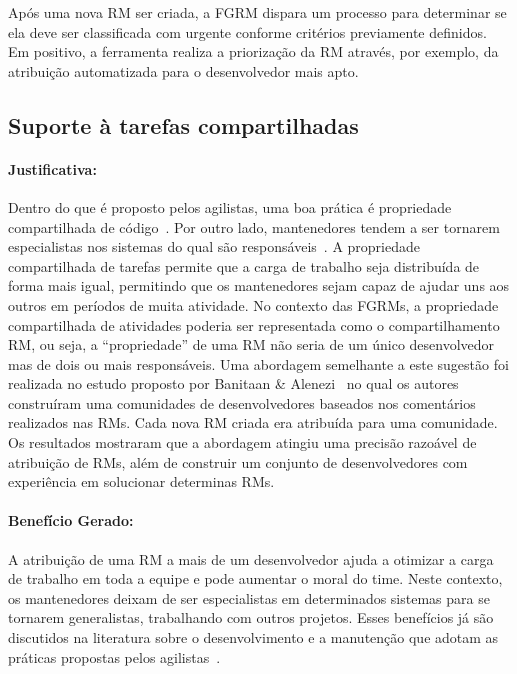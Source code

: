 Após uma nova RM ser criada, a FGRM dispara um processo para determinar se ela
deve ser classificada com urgente conforme critérios previamente definidos. Em
positivo, a ferramenta realiza a priorização da RM através, por exemplo, da
atribuição automatizada para o desenvolvedor mais apto.

\subsection{Suporte à tarefas compartilhadas}
\label{sub:suporte_tarefas_compartilhadas}


\paragraph{Justificativa:}
\label{par:justificativa_s08}

Dentro do que é proposto pelos agilistas, uma boa prática é propriedade
compartilhada de código~\cite{meyer2014agile}. Por outro lado, mantenedores
tendem a ser tornarem especialistas nos sistemas do qual são
responsáveis~\cite{singer1998practices}. A propriedade compartilhada de tarefas
permite que a carga de trabalho seja distribuída de forma mais igual, permitindo
que os mantenedores sejam capaz de ajudar uns aos outros em períodos de muita
atividade. No contexto das FGRMs, a propriedade compartilhada de atividades
poderia ser representada como o compartilhamento RM, ou seja, a ``propriedade''
de uma RM não seria de um único desenvolvedor mas de dois ou mais responsáveis.
Uma abordagem semelhante a este sugestão foi realizada no estudo proposto por
Banitaan \& Alenezi~\cite{banitaan2013decoba} no qual os autores construíram uma
comunidades de desenvolvedores baseados nos comentários realizados nas RMs. Cada
nova RM criada era atribuída para uma comunidade. Os resultados mostraram que a
abordagem atingiu uma precisão razoável de atribuição de RMs, além de construir
um conjunto de desenvolvedores com experiência em solucionar determinas RMs.

\paragraph{Benefício Gerado:}
\label{par:papéis_afetados_s08}

A atribuição de uma RM a mais de um desenvolvedor ajuda a otimizar a carga de
trabalho em toda a equipe e pode aumentar o moral do time. Neste contexto, os
mantenedores deixam de ser especialistas em determinados sistemas para se
tornarem generalistas, trabalhando com outros projetos. Esses benefícios já são
discutidos na literatura sobre o desenvolvimento e a manutenção que adotam as
práticas propostas pelos agilistas~\cite{dybaa2008empirical,rudzki2009agile}.

